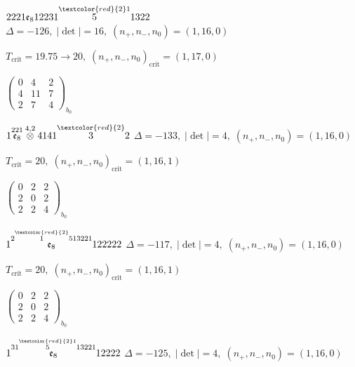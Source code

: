 \documentclass[10pt]{article}
\begin{document}
\smallskip

$2221\mathfrak{e}_812231\overset{\textcolor{red}{2}1}{5}1322$ \quad $\Delta=-126,\; |\det|=16,\; (n_+,n_-,n_0)=(1,16,0)$

\hspace{1em}$T_{\text{crit}}=19.75 \to 20,\; (n_+,n_-,n_0)_{\text{crit}}=(1,17,0)$

\hspace{2em}$\left(\begin{smallmatrix}0 & 4 & 2 \\ 4 & 11 & 7 \\ 2 & 7 & 4\end{smallmatrix}\right)_{\!b_0}$

\smallskip

$1\overset{221}{\mathfrak{e}_8}\overset{4,2}{\otimes}4141\overset{\textcolor{red}{2}}{3}2$ \quad $\Delta=-133,\; |\det|=4,\; (n_+,n_-,n_0)=(1,16,0)$

\hspace{1em}$T_{\text{crit}}=20,\; (n_+,n_-,n_0)_{\text{crit}}=(1,16,1)$

\hspace{2em}$\left(\begin{smallmatrix}0 & 2 & 2 \\ 2 & 0 & 2 \\ 2 & 2 & 4\end{smallmatrix}\right)_{\!b_0}$

\smallskip

$1\overset{2\overset{\textcolor{red}{2}}{1}513221}{\mathfrak{e}_8}122222$ \quad $\Delta=-117,\; |\det|=4,\; (n_+,n_-,n_0)=(1,16,0)$

\hspace{1em}$T_{\text{crit}}=20,\; (n_+,n_-,n_0)_{\text{crit}}=(1,16,1)$

\hspace{2em}$\left(\begin{smallmatrix}0 & 2 & 2 \\ 2 & 0 & 2 \\ 2 & 2 & 4\end{smallmatrix}\right)_{\!b_0}$

\smallskip

$1\overset{31\overset{\textcolor{red}{2}1}{5}13221}{\mathfrak{e}_8}12222$ \quad $\Delta=-125,\; |\det|=4,\; (n_+,n_-,n_0)=(1,16,0)$
\end{document}
